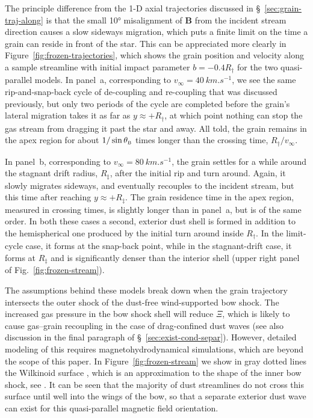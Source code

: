 The principle difference from the 1-D axial trajectories discussed in
\S~\ref{sec:grain-traj-along} is that the small \ang{10} misalignment
of \(\bm{B}\) from the incident stream direction causes a slow
sideways migration, which puts a finite limit on the time a grain can
reside in front of the star.  This can be appreciated more clearly in
Figure~\ref{fig:frozen-trajectories}, which shows the grain position
and velocity along a sample streamline with initial impact parameter
\(b = -0.4 R_\dag\) for the two quasi-parallel models.  In panel~a,
corresponding to \(v_\infty = \SI{40}{km.s^{-1}}\), we see the same
rip-and-snap-back cycle of de-coupling and re-coupling that was
discussed previously, but only two periods of the cycle are completed
before the grain's lateral migration takes it as far as
\(y \approx +R_\dag\), at which point nothing can stop the gas stream from
dragging it past the star and away.  All told, the grain remains in
the apex region for about \(1/\sin\theta_{\scriptscriptstyle\text{B}}\) times longer than the crossing
time, \(R_\dag / v_\infty\).

In panel~b, corresponding to \(v_\infty = \SI{80}{km.s^{-1}}\), the grain
settles for a while around the stagnant drift radius, \(R_\ddag\), after
the initial rip and turn around.  Again, it slowly migrates sideways,
and eventually recouples to the incident stream, but this time after
reaching \(y \approx +R_\ddag\).  The grain residence time in the apex region,
measured in crossing times, is slightly longer than in panel~a, but is
of the same order.  In both these cases a second, exterior dust
shell is formed in addition to the hemispherical one produced by the
initial turn around inside \(R_\dag\). In the limit-cycle case, it forms
at the snap-back point, while in the stagnant-drift case, it forms at
\(R_\ddag\) and is significantly denser than the interior shell (upper
right panel of Fig.~\ref{fig:frozen-stream}).

The assumptions behind these models break down when the grain
trajectory intersects the outer shock of the dust-free wind-supported
bow shock.  The increased gas pressure in the bow shock shell will
reduce \(\Xi\), which is likely to cause gas--grain recoupling in the
case of drag-confined dust waves (see also discussion in the final
paragraph of \S~\ref{sec:exist-cond-separ}).  However, detailed
modeling of this requires magnetohydrodynamical simulations, which are
beyond the scope of this paper.  In Figure~\ref{fig:frozen-stream} we
show in gray dotted lines the Wilkinoid surface \citep{Wilkin:1996a},
which is an approximation to the shape of the inner bow shock, see
\citet{Tarango-Yong:2018a}.  It can be seen that the majority of dust
streamlines do not cross this surface until well into the wings of the
bow, so that a separate exterior dust wave can exist for this
quasi-parallel magnetic field orientation.

